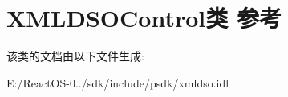 \hypertarget{class_x_m_l_d_s_o_control}{}\section{X\+M\+L\+D\+S\+O\+Control类 参考}
\label{class_x_m_l_d_s_o_control}


该类的文档由以下文件生成\+:\begin{DoxyCompactItemize}
\item 
E\+:/\+React\+O\+S-\/0../sdk/include/psdk/xmldso.\+idl\end{DoxyCompactItemize}
